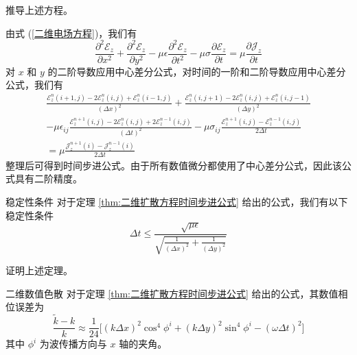 \begin{exercise}
    推导上述方程。
\end{exercise}

\begin{solution}
    由式 (\ref{二维电场方程})，我们有
    \begin{equation*}
        \frac{\partial^2 \mathscr{E}_z}{\partial x^2}
        +\frac{\partial^2 \mathscr{E}_z}{\partial y^2}
        -\mu \epsilon \frac{\partial^2 \mathscr{E}_z}{\partial t^2}
        -\mu \sigma \frac{\partial \mathscr{E}_z}{\partial t}
        =\mu \frac{\partial \mathscr{J}_z}{\partial t}
    \end{equation*}
    对 $x$ 和 $y$ 的二阶导数应用中心差分公式，对时间的一阶和二阶导数应用中心差分公式，我们有
    \begin{equation*}
        \begin{gathered}
            \frac{\mathscr{E}_z^{n}(i+1,j)-2\mathscr{E}_z^n(i,j)+\mathscr{E}_z^{n}(i-1,j)}{(\Delta x)^2}
            +\frac{\mathscr{E}_z^{n}(i,j+1)-2\mathscr{E}_z^n(i,j)+\mathscr{E}_z^{n}(i,j-1)}{(\Delta y)^2}\\
            -\mu \epsilon_{ij} \frac{\mathscr{E}_z^{n+1}(i,j)-2\mathscr{E}_z^n(i,j)+2\mathscr{E}_z^{n-1}(i,j)}{(\Delta t)^2}
            -\mu \sigma_{ij} \frac{\mathscr{E}_z^{n+1}(i,j)-\mathscr{E}_z^{n-1}(i,j)}{2\Delta t}\\
            =\mu \frac{\mathscr{J}_z^{n+1}(i)-\mathscr{J}_z^{n-1}(i)}{2\Delta t}
        \end{gathered}
    \end{equation*}
    整理后可得到时间步进公式。由于所有数值微分都使用了中心差分公式，因此该公式具有二阶精度。
\end{solution}

\begin{theorem}{稳定性条件}
    对于定理 \ref{thm:二维扩散方程时间步进公式} 给出的公式，我们有以下稳定性条件
    \begin{equation}
        \Delta t \leq \frac{\sqrt{\mu \epsilon}}
        {\sqrt{\frac{1}{(\Delta x)^2}+\frac{1}{(\Delta y)^2}}}
    \end{equation}
\end{theorem}

\begin{exercise}
    证明上述定理。
\end{exercise}

\begin{theorem}{二维数值色散}
    对于定理 \ref{thm:二维扩散方程时间步进公式} 给出的公式，其数值相位误差为
    \begin{equation}
        \frac{\tilde{k}-k}{k}
        \approx\frac{1}{24}
        \Big[(k\Delta x)^2\cos^4\phi^i+(k\Delta y)^2\sin^4\phi^i-(\omega \Delta t)^2\Big]
    \end{equation}
    其中 $\phi^i$ 为波传播方向与 $x$ 轴的夹角。
\end{theorem}

